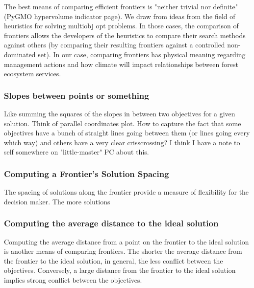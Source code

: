 The best means of comparing efficient frontiers is "neither trivial nor definite" (PyGMO hypervolume indicator page). We draw from ideas from the field of heuristics for solving multiobj opt problems. In those cases, the comparison of frontiers allows the developers of the heuristics to compare their search methods against others (by comparing their resulting frontiers against a controlled non-dominated set). In our case, comparing frontiers has physical meaning regarding management actions and how climate will impact relationships between forest ecosystem services.

\subsubsection{Slopes between points or something}
Like summing the squares of the slopes in between two objectives for a given solution. Think of parallel coordinates plot. How to capture the fact that some objectives have a bunch of straight lines going between them (or lines going every which way) and others have a very clear crisscrossing? I think I have a note to self somewhere on "little-master" PC about this. 

\subsubsection{Computing a Frontier's Solution Spacing}
The spacing of solutions along the frontier provide a measure of flexibility for the decision maker. The more solutions 

\subsubsection{Computing the average distance to the ideal solution}
Computing the average distance from a point on the frontier to the ideal solution is another means of comparing frontiers. The shorter the average distance from the frontier to the ideal solution, in general, the less conflict between the objectives. Conversely, a large distance from the frontier to the ideal solution implies strong conflict between the objectives.

